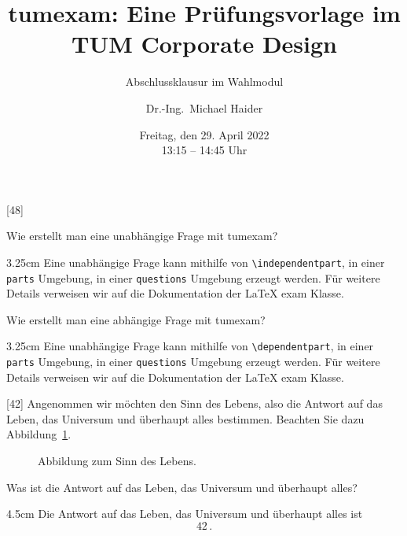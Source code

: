 \documentclass[german, @CLASSOPTIONS@]{tumexam}
\title{tumexam: Eine Prüfungsvorlage im TUM Corporate Design}
\subtitle{Abschlussklausur im Wahlmodul}
\author[orcid=0000-0002-5164-432X]{Dr.-Ing.\ Michael Haider}
\date{Freitag, den 29. April 2022\\
  13:15 -- 14:45 Uhr}
\begin{document}
\maketitle

\clearpage

\begin{questions}
  [48]
  \begin{parts}
    \independentpart
    Wie erstellt man eine unabhängige Frage mit tumexam?
    \begin{solutionbox}{3.25cm}
      Eine unabhängige Frage kann mithilfe von \texttt{\textbackslash{independentpart}}, in einer \texttt{parts} Umgebung, in einer \texttt{questions} Umgebung erzeugt werden. Für weitere Details verweisen wir auf die Dokumentation der \LaTeX{} exam Klasse.
    \end{solutionbox}
    \dependentpart
    Wie erstellt man eine abhängige Frage mit tumexam?
    \begin{solutionbox}{3.25cm}
      Eine unabhängige Frage kann mithilfe von \texttt{\textbackslash{dependentpart}}, in einer \texttt{parts} Umgebung, in einer \texttt{questions} Umgebung erzeugt werden. Für weitere Details verweisen wir auf die Dokumentation der \LaTeX{} exam Klasse.
    \end{solutionbox}
  \end{parts}
  \clearpage
  [42]
  Angenommen wir möchten den Sinn des Lebens, also die Antwort auf das Leben, das Universum und überhaupt alles bestimmen. Beachten Sie dazu Abbildung~\ref{fig-graph-1}.
  \begin{figure}[h]
    \centering
    \caption{Abbildung zum Sinn des Lebens.}
    \label{fig-graph-1}
  \end{figure}
  \begin{parts}
    \independentpart
    Was ist die Antwort auf das Leben, das Universum und überhaupt alles?
    \begin{solutionbox}{4.5cm} %
      Die Antwort auf das Leben, das Universum und überhaupt alles ist
      \begin{equation*}
        42\, .
      \end{equation*}
    \end{solutionbox}

\end{parts}
\end{questions}
\end{document}

